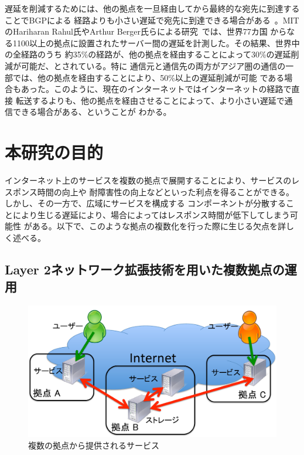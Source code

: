 遅延を削減するためには、他の拠点を一旦経由してから最終的な宛先に到達することでBGPによる
経路よりも小さい遅延で宛先に到達できる場合がある~\cite{netvirt}。MITのHariharan Rahul氏やArthur Berger氏らによる研究~\cite{mittech}では、世界77カ国
からなる1100以上の拠点に設置されたサーバー間の遅延を計測した。その結果、世界中の全経路のうち
約35\%の経路が、他の拠点を経由することによって30\%の遅延削減が可能だ、とされている。特に
通信元と通信先の両方がアジア圏の通信の一部では、他の拠点を経由することにより、50\%以上の遅延削減が可能
である場合もあった。このように、現在のインターネットではインターネットの経路で直接
転送するよりも、他の拠点を経由させることによって、より小さい遅延で通信できる場合がある、ということが
わかる。

\section{本研究の目的}
\label{background:ml3}

インターネット上のサービスを複数の拠点で展開することにより、サービスのレスポンス時間の向上や
耐障害性の向上などといった利点を得ることができる。しかし、その一方で、広域にサービスを構成する
コンポーネントが分散することにより生じる遅延により、場合によってはレスポンス時間が低下してしまう可能性
がある。以下で、このような拠点の複数化を行った際に生じる欠点を詳しく述べる。

\subsection{Layer 2ネットワーク拡張技術を用いた複数拠点の運用}
\label{backgound:ml31}

\begin{figure}
	\begin{center}
		\includegraphics[scale=0.50]{./img/serviceanduser}
		\caption{複数の拠点から提供されるサービス}
		\label{img:mlservice}
	\end{center}
\end{figure}


